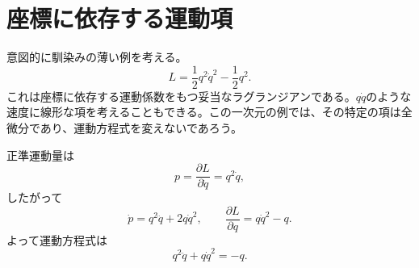 \begin{classroomqa}
\end{classroomqa}

\begin{classroomqa}
\end{classroomqa}

\begin{classroomqa}
\end{classroomqa}

\section{座標に依存する運動項}

意図的に馴染みの薄い例を考える。
\begin{equation}
  L=\frac12q^2\dot q^2-\frac12q^2.
  \label{eq:l5-nonstandard-l}
\end{equation}
これは座標に依存する運動係数をもつ妥当なラグランジアンである。\(q\dot q\)のような速度に線形な項を考えることもできる。この一次元の例では、その特定の項は全微分であり、運動方程式を変えないであろう。

正準運動量は
\begin{equation}
  p=\frac{\partial L}{\partial\dot q}=q^2\dot q,
  \label{eq:l5-nonstandard-p}
\end{equation}
したがって
\begin{equation}
  \dot p=q^2\ddot q+2q\dot q^2,
  \qquad
  \frac{\partial L}{\partial q}=q\dot q^2-q.
  \label{eq:l5-nonstandard-derivatives}
\end{equation}
よって運動方程式は
\begin{equation}
  q^2\ddot q+q\dot q^2=-q.
  \label{eq:l5-nonstandard-eom}
\end{equation}

